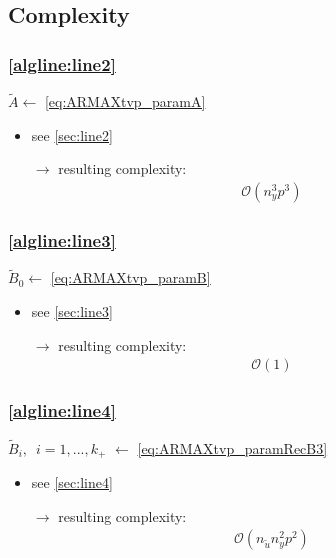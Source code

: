 \documentclass{article}
\begin{document}
\subsection{Complexity}
\subsubsection{\cref{algline:line2}} 
$\tilde{A} \gets$ \cref{eq:ARMAXtvp_paramA} 
\begin{itemize}
    \item see \cref{sec:line2}
    \item[$\rightarrow$] resulting complexity: 
    \begin{align*}
        \mathcal{O}(n_y^3 p^3)
    \end{align*}
\end{itemize}


\subsubsection{\cref{algline:line3}} 
$\tilde{B}_0 \gets$ \cref{eq:ARMAXtvp_paramB}
\begin{itemize}
    \item see \cref{sec:line3}
    \item[$\rightarrow$] resulting complexity: 
    \begin{align*}
        \mathcal{O}(1)
    \end{align*}
\end{itemize}

\subsubsection{\cref{algline:line4}} 
$\tilde{B}_i,$~{\small $i=1,...,k_+$} $\gets$ \cref{eq:ARMAXtvp_paramRecB3}
\begin{itemize}
    \item see \cref{sec:line4}
    \item[$\rightarrow$] resulting complexity: 
    \begin{align*}
        \mathcal{O}(n_{\tilde{u}} n_y^2 p^2)
    \end{align*}
\end{itemize}
\end{document}
